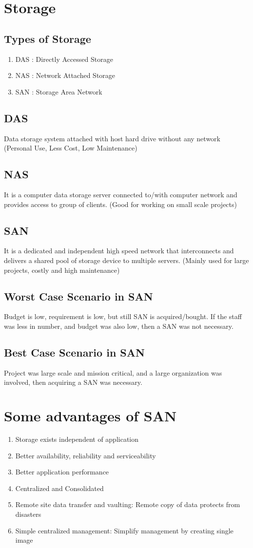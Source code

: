 \documentclass{article}
\begin{document}
\section*{Storage}
\subsection*{Types of Storage}
\begin{enumerate}
    \item DAS : Directly Accessed Storage
    \item NAS : Network Attached Storage
    \item SAN : Storage Area Network
\end{enumerate}
\subsection*{DAS}
Data storage system attached with host hard drive without any network (Personal Use, Less Cost, Low Maintenance)
\subsection*{NAS}
It is a computer data storage server connected to/with computer network and provides access to group of clients. (Good for working on small scale projects)
\subsection*{SAN}
It is a dedicated and independent high speed network that interconnects and delivers a shared pool of storage device to multiple servers. (Mainly used for large projects, costly and high maintenance)
\subsection*{Worst Case Scenario in SAN}
Budget is low, requirement is low, but still SAN is acquired/bought. If the staff was less in number, and budget was also low, then a SAN was not necessary.
\subsection*{Best Case Scenario in SAN}
Project was large scale and mission critical, and a large organization was involved, then acquiring a SAN was necessary.
\section*{Some advantages of SAN}
\begin{enumerate}
    \item Storage exists independent of application
    \item Better availability, reliability and serviceability
    \item Better application performance
    \item Centralized and Consolidated
    \item Remote site data transfer and vaulting: Remote copy of data protects from disasters
    \item Simple centralized management: Simplify management by creating single image
\end{enumerate}
\end{document}
